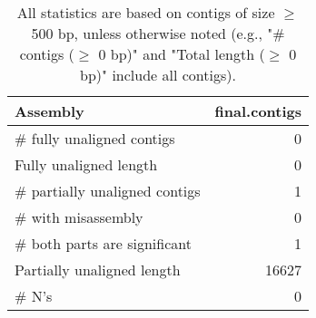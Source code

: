 \documentclass[12pt,a4paper]{article}
\begin{document}
\begin{table}[ht]
\begin{center}
\caption{All statistics are based on contigs of size $\geq$ 500 bp, unless otherwise noted (e.g., "\# contigs ($\geq$ 0 bp)" and "Total length ($\geq$ 0 bp)" include all contigs).}
\begin{tabular}{|l*{1}{|r}|}
\hline
Assembly & final.contigs \\ \hline
\# fully unaligned contigs & 0 \\ \hline
Fully unaligned length & 0 \\ \hline
\# partially unaligned contigs & 1 \\ \hline
\hspace{5mm}\# with misassembly & 0 \\ \hline
\hspace{5mm}\# both parts are significant & 1 \\ \hline
Partially unaligned length & 16627 \\ \hline
\# N's & 0 \\ \hline
\end{tabular}
\end{center}
\end{table}
\end{document}
